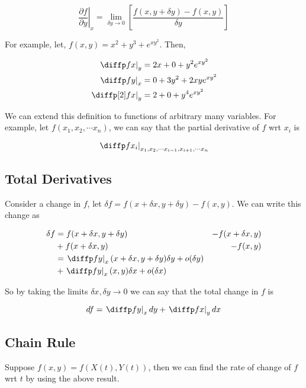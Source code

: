 \documentclass[12pt]{article}
\begin{document}
\[
    \left.\frac{\partial f}{\partial y}\right|_x 
        = \lim_{\delta y \to 0}\left[\frac{f(x, y + \delta y) - f(x,y)}{\delta y}\right]
\]

For example, let, $f(x,y) = x^{2} + y^{3} + e^{xy^{2}}$. Then,

\[ \begin{aligned}
    \left.\diffp f x\right |_{y} &= 2x + 0 + y^{2}e^{xy^{2}} \\
    \left.\diffp f y\right |_{x} &= 0 + 3y^{2} +  2xy e^{xy^{2}} \\
    \left.\diffp[2] f x\right |_{y} &= 2 + 0 + y^{4}e^{xy^{2}} \\
\end{aligned} \]

We can extend this definition to functions of arbitrary many variables.
For example, let $f(x_{1},x_{2},\cdots x_{n})$, we can say that the partial derivative of
$f$ wrt $x_{i}$ is

\[\left.\diffp f x_i\right|_{x_{1},x_{2}, \cdots x_{i-1}, x_{i+1},\cdots x_{n}}\]

\subsection{Total Derivatives}

Consider a change in $f$, let $\delta f = f(x + \delta x, y + \delta y) - f(x,y)$.
We can write this change as

\[
    \begin{aligned}
        \delta f &= f(x + \delta x,y+\delta y) &- f(x + \delta x,y) \\
                 &+ f(x + \delta x,y) &- f(x,y) \\
            &= \left.\diffp f y\right|_{x} (x + \delta x, y+\delta y)\delta y + o(\delta  y) \\
            &+ \left.\diffp f y\right|_{x} (x, y)\delta x + o(\delta  x)
    \end{aligned}
\]

So by taking the limits $\delta x,\delta y\to 0$ we can say that the total change in $f$ is

\[d f = \left.\diffp f y\right|_{x}d y 
    + \left.\diffp f x\right|_{y}dx\]

\subsection{Chain Rule}

Suppose $f(x,y)=f(X(t),Y(t))$, then we can find the
rate of change of $f$ wrt $t$ by using the above result.
\end{document}
